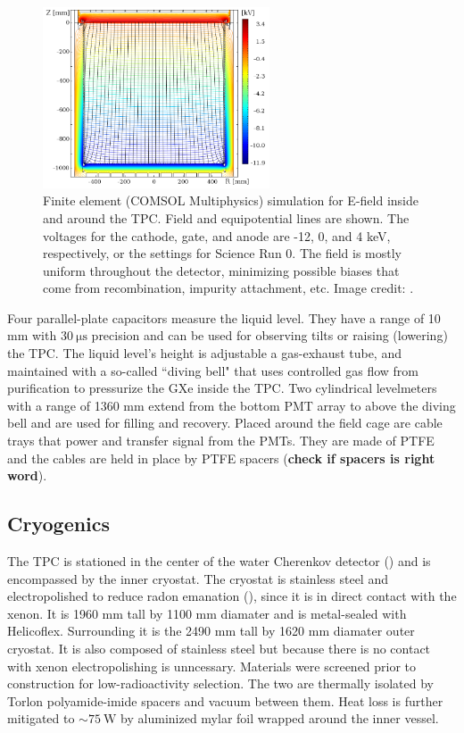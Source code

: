 \begin{figure}
\centering
\includegraphics[width=0.6\textwidth]{ElectricField}
\caption{Finite element (COMSOL Multiphysics) simulation for E-field inside and around the TPC.  Field and equipotential lines are
shown.  The voltages for the cathode, gate, and anode are -12, 0, and 4 keV, respectively, or the settings for Science Run 0.  The field
is mostly uniform throughout the detector, minimizing possible biases that come from recombination, impurity attachment, etc.  Image
credit: .}
\label{fig:xenon1t_tpc_efield}
\end{figure}

Four parallel-plate capacitors measure the liquid level.  They have a range of 10 mm with $30\ \mathrm{\mu s}$ precision and can be used
for observing tilts or raising (lowering) the TPC.  The liquid level's height is adjustable a gas-exhaust tube, and maintained with a
so-called ``diving bell" that uses controlled gas flow from purification to pressurize the GXe inside the TPC.  Two cylindrical levelmeters
with a range of 1360 mm extend from the bottom PMT array to above the diving bell and are used for filling and recovery.  Placed around the
field cage are cable trays that power and transfer signal from the PMTs.  They are made of PTFE and the cables are held
in place by PTFE spacers (\textbf{check if spacers is right word}).



\subsection{Cryogenics}
\label{subsec:xenon1t_cryo}
The TPC is stationed in the center of the water Cherenkov detector () and is encompassed by the inner
cryostat.  The cryostat
is stainless steel and electropolished to reduce radon emanation (\secref{}), since it is in direct contact with the xenon.  It is 1960 mm
tall by 1100 mm diamater and is metal-sealed
with Helicoflex.  Surrounding it is the 2490 mm tall by 1620 mm diamater outer cryostat.  It is also composed of stainless steel but
because there is no contact with xenon electropolishing is unncessary.  Materials were screened prior to construction for low-radioactivity
selection.  The two are thermally isolated by Torlon polyamide-imide spacers and
vacuum between them.  Heat loss is further mitigated to ${\sim} 75\ \mathrm{W}$ by aluminized mylar foil wrapped around the inner vessel.

